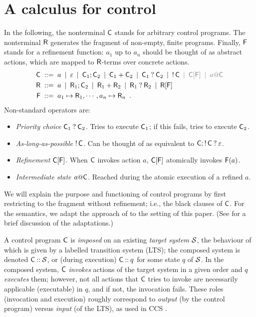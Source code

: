 \section{A calculus for control}
\label{sec:calculus}

In the following, the nonterminal $\mathsf{C}$ stands for arbitrary control programs. The nonterminal $\mathsf{R}$ generates the fragment of non-empty, finite programs. Finally, $\mathsf{F}$ stands for a refinement function: $a_1$ up to $a_n$ should be thought of as abstract actions, which are mapped to $\mathsf{R}$-terms over concrete actions.
%
\begin{align*}
\rC & \ruleis a \rulemid \term \rulemid \rC_1;\rC_2 \rulemid \rC_1+\rC_2 \rulemid \rC_1\orelse \rC_2 \rulemid \alap \rC \color{gray} \rulemid \rC[\rF] \rulemid a@\rC \color{black} \\
\rR & \ruleis a \rulemid \rR_1;\rC_2 \rulemid \rR_1+\rR_2 \rulemid \rR_1\orelse \rR_2 \rulemid \rR[\rF] \\
\rF & \ruleis a_1 \mapsto \rR_1, \cdots, a_n\mapsto \rR_n \enspace.
\end{align*}
%
Non-standard operators are:
\begin{itemize}
\item \emph{Priority choice} $\mathsf{C}_1\mathbin{?} \mathsf{C}_2$. Tries to execute $\mathsf{C}_1$; if this fails, tries to execute $\mathsf{C}_2$.
\item \emph{As-long-as-possible} $\mathop{!} \mathsf{C}$. Can be thought of as equivalent to $\mathsf{C};\mathop{!} \mathsf{C}\mathbin{?} \varepsilon$.
\item \emph{Refinement} $\mathsf{C}[\mathsf{F}]$. When $\mathsf{C}$ invokes action $a$, $\mathsf{C}[\mathsf{F}]$ atomically invokes $\mathsf{F}(a)$.
\item \emph{Intermediate state $a@\mathsf{C}$}. Reached during the atomic execution of a refined $a$.
\end{itemize}
%
We will explain the purpose and functioning of control programs by first restricting to the fragment without refinement; i.e., the black clauses of $\mathsf{C}$. For the semantics, we adapt the approach of \cite{CCS-Priority-Choice} to the setting of this paper. (See  for a brief discussion of the adaptations.)

A control program $\mathsf{C}$ is \emph{imposed} on an existing \emph{target system} $\mathcal{S}$, the behaviour of which is given by a labelled transition system (LTS); the composed system is denoted $\mathsf{C}\mathbin{{:}{:}}\mathcal{S}$, or (during execution) $\mathsf{C}\mathbin{{:}{:}} q$ for some state $q$ of $\mathcal{S}$. In the composed system, $\mathsf{C}$ \emph{invokes} actions of the target system in a given order and $q$ \emph{executes} them; however, not all actions that $\mathsf{C}$ tries to invoke are necessarily applicable (executable) in $q$, and if not, the invocation fails. These roles (invocation and execution) roughly correspond to \emph{output} (by the control program) versus \emph{input} (of the LTS), as used in CCS \cite{CCS}.

